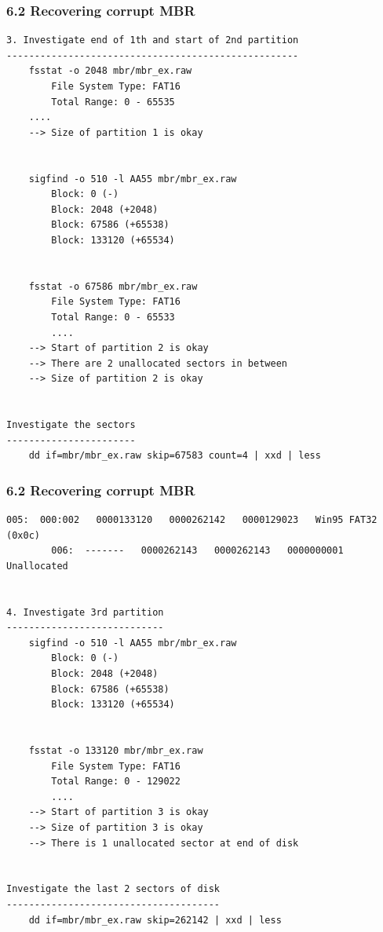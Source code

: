 \begin{frame}[fragile]
  \frametitle{6.2 Recovering corrupt MBR}
  \begin{lstlisting}[basicstyle=\tiny]
3. Investigate end of 1th and start of 2nd partition
----------------------------------------------------
    fsstat -o 2048 mbr/mbr_ex.raw
        File System Type: FAT16
        Total Range: 0 - 65535
	....
	--> Size of partition 1 is okay


    sigfind -o 510 -l AA55 mbr/mbr_ex.raw
        Block: 0 (-)
        Block: 2048 (+2048)
        Block: 67586 (+65538)
        Block: 133120 (+65534)


    fsstat -o 67586 mbr/mbr_ex.raw
        File System Type: FAT16
        Total Range: 0 - 65533
        ....
	--> Start of partition 2 is okay
	--> There are 2 unallocated sectors in between
	--> Size of partition 2 is okay 


Investigate the sectors
-----------------------
    dd if=mbr/mbr_ex.raw skip=67583 count=4 | xxd | less
  \end{lstlisting}
\end{frame}


\begin{frame}[fragile]
  \frametitle{6.2 Recovering corrupt MBR}
  \begin{lstlisting}[basicstyle=\tiny]
        005:  000:002   0000133120   0000262142   0000129023   Win95 FAT32 (0x0c)
        006:  -------   0000262143   0000262143   0000000001   Unallocated

  
4. Investigate 3rd partition
----------------------------
    sigfind -o 510 -l AA55 mbr/mbr_ex.raw
        Block: 0 (-)
        Block: 2048 (+2048)
        Block: 67586 (+65538)
        Block: 133120 (+65534)


    fsstat -o 133120 mbr/mbr_ex.raw
        File System Type: FAT16
        Total Range: 0 - 129022
        ....
	--> Start of partition 3 is okay
	--> Size of partition 3 is okay 
	--> There is 1 unallocated sector at end of disk


Investigate the last 2 sectors of disk
--------------------------------------
    dd if=mbr/mbr_ex.raw skip=262142 | xxd | less
  \end{lstlisting}
\end{frame}


